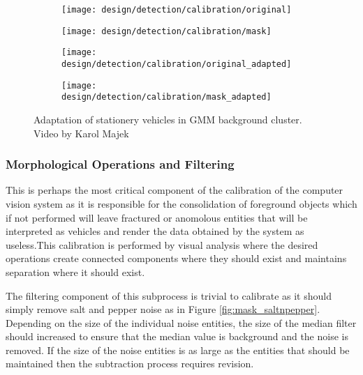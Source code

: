 \begin{figure}[H]
	\centering
	\begin{subfigure}[b]{0.5\linewidth}
        \centering\texttt{[image: design/detection/calibration/original]}
        \caption{}
        \label{fig:}
    \end{subfigure}%
    \begin{subfigure}[b]{0.5\linewidth}
        \centering\texttt{[image: design/detection/calibration/mask]}
        \caption{}
        \label{fig:}
    \end{subfigure}
    \begin{subfigure}[b]{0.5\linewidth}
        \centering\texttt{[image: design/detection/calibration/original\_adapted]}
        \caption{}
		\label{fig:}
    \end{subfigure}%
    	\begin{subfigure}[b]{0.5\linewidth}
        \centering\texttt{[image: design/detection/calibration/mask\_adapted]}
        \caption{}
        \label{fig:}
    \end{subfigure}
    \caption{Adaptation of stationery vehicles in GMM background cluster. Video by Karol Majek}
    \label{fig:cluster_adaptation}
\end{figure}



\subsubsection{Morphological Operations and Filtering}

This is perhaps the most critical component of the calibration of the computer vision system as it is responsible for the consolidation of foreground objects which if not performed will leave fractured or anomolous entities that will be interpreted as vehicles and render the data obtained by the system as useless.This calibration is performed by visual analysis where the desired operations create connected components where they should exist and maintains separation where it should exist. 

The filtering component of this subprocess is trivial to calibrate as it should simply remove salt and pepper noise as in Figure \ref{fig:mask_saltnpepper}. Depending on the size of the individual noise entities, the size of the median filter should increased to ensure that the median value is background and the noise is removed. If the size of the noise entities is as large as the entities that should be maintained then the subtraction process requires revision. 

